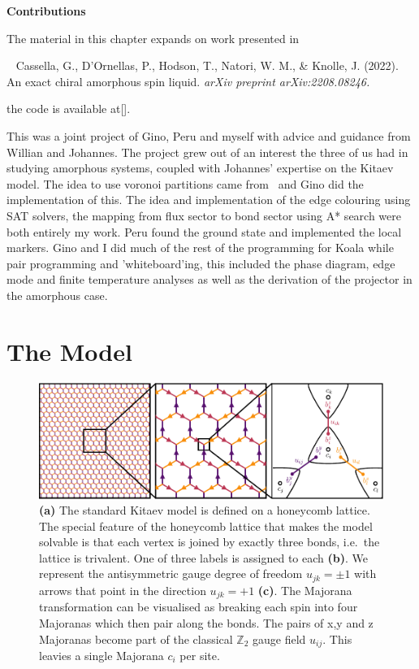 \textbf{Contributions}

The material in this chapter expands on work presented in

~\autocite{cassellaExactChiralAmorphous2022} Cassella, G., D'Ornellas, P., Hodson, T., Natori, W. M., \& Knolle, J. (2022). An exact chiral amorphous spin liquid. \emph{arXiv preprint arXiv:2208.08246.}

the code is available at{[}\textcite{hodsonKoalaKitaevAmorphous2022}{]}.

This was a joint project of Gino, Peru and myself with advice and guidance from Willian and Johannes. The project grew out of an interest the three of us had in studying amorphous systems, coupled with Johannes' expertise on the Kitaev model. The idea to use voronoi partitions came from~\autocite{marsalTopologicalWeaireThorpe2020} and Gino did the implementation of this. The idea and implementation of the edge colouring using SAT solvers, the mapping from flux sector to bond sector using A* search were both entirely my work. Peru found the ground state and implemented the local markers. Gino and I did much of the rest of the programming for Koala while pair programming and 'whiteboard'ing, this included the phase diagram, edge mode and finite temperature analyses as well as the derivation of the projector in the amorphous case.

\hypertarget{amk-Model}{%
\section{The Model}\label{amk-Model}}

\hypertarget{fig:intro_figure_by_hand}{%
\begin{figure}
\centering
\includegraphics[width=1\textwidth,height=\textheight]{figure_code/amk_chapter/intro/honeycomb_zoom/intro_figure_by_hand}
\caption[{The Kitaev Honeycomb Model}]{\textbf{(a)} The standard Kitaev model is defined on a honeycomb lattice. The special feature of the honeycomb lattice that makes the model solvable is that each vertex is joined by exactly three bonds, i.e.~the lattice is trivalent. One of three labels is assigned to each \textbf{(b)}. We represent the antisymmetric gauge degree of freedom \(u_{jk} = \pm 1\) with arrows that point in the direction \(u_{jk} = +1\) \textbf{(c)}. The Majorana transformation can be visualised as breaking each spin into four Majoranas which then pair along the bonds. The pairs of x,y and z Majoranas become part of the classical \(\mathbb{Z}_2\) gauge field \(u_{ij}\). This leavies a single Majorana \(c_i\) per site.}
\label{fig:intro_figure_by_hand}
\end{figure}
}

